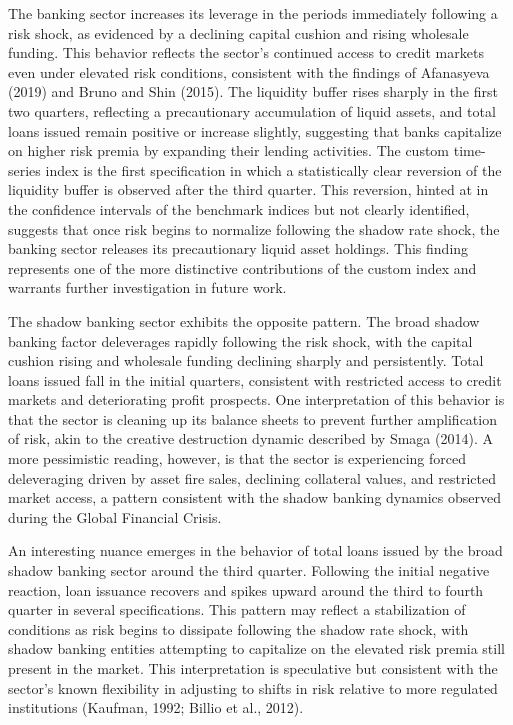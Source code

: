 \documentclass[12pt,a4paper]{report}\usepackage[a4paper, top=2.5cm, bottom=2.5cm, left=2.5cm, right=2.5cm]{geometry}
\begin{document}
The banking sector increases its leverage in the periods immediately following
a risk shock, as evidenced by a declining capital cushion and rising wholesale
funding. This behavior reflects the sector's continued access to credit markets
even under elevated risk conditions, consistent with the findings of Afanasyeva
(2019) and Bruno and Shin (2015). The liquidity buffer rises sharply in the
first two quarters, reflecting a precautionary accumulation of liquid assets,
and total loans issued remain positive or increase slightly, suggesting that
banks capitalize on higher risk premia by expanding their lending activities.
The custom time-series index is the first specification in which a statistically
clear reversion of the liquidity buffer is observed after the third quarter.
This reversion, hinted at in the confidence intervals of the benchmark indices
but not clearly identified, suggests that once risk begins to normalize following
the shadow rate shock, the banking sector releases its precautionary liquid
asset holdings. This finding represents one of the more distinctive contributions
of the custom index and warrants further investigation in future work.

The shadow banking sector exhibits the opposite pattern. The broad shadow
banking factor deleverages rapidly following the risk shock, with the capital
cushion rising and wholesale funding declining sharply and persistently. Total
loans issued fall in the initial quarters, consistent with restricted access to
credit markets and deteriorating profit prospects. One interpretation of this
behavior is that the sector is cleaning up its balance sheets to prevent further
amplification of risk, akin to the creative destruction dynamic described by
Smaga (2014). A more pessimistic reading, however, is that the sector is
experiencing forced deleveraging driven by asset fire sales, declining collateral
values, and restricted market access, a pattern consistent with the shadow
banking dynamics observed during the Global Financial Crisis.

An interesting nuance emerges in the behavior of total loans issued by the
broad shadow banking sector around the third quarter. Following the initial
negative reaction, loan issuance recovers and spikes upward around the third
to fourth quarter in several specifications. This pattern may reflect a
stabilization of conditions as risk begins to dissipate following the shadow rate
shock, with shadow banking entities attempting to capitalize on the elevated
risk premia still present in the market. This interpretation is speculative but
consistent with the sector's known flexibility in adjusting to shifts in risk
relative to more regulated institutions (Kaufman, 1992; Billio et al., 2012).
\end{document}
